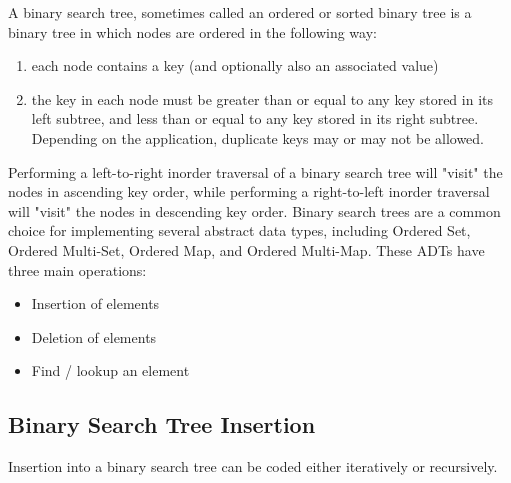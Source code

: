 \documentclass{report}
\begin{document}
    \pagebreak 
    \bigbreak \noindent 
    \begin{concept}
        A binary search tree, sometimes called an ordered or sorted binary tree is a binary tree in which nodes are ordered in the following way:
        \begin{enumerate}
            \item each node contains a key (and optionally also an associated value)
            \item the key in each node must be greater than or equal to any key stored in its left subtree, and less than or equal to any key stored in its right subtree. Depending on the application, duplicate keys may or may not be allowed.
        \end{enumerate}
    \end{concept}
    \bigbreak \noindent 
    Performing a left-to-right inorder traversal of a binary search tree will "visit" the nodes in ascending key order, while performing a right-to-left inorder traversal will "visit" the nodes in descending key order.
    \bigbreak \noindent 
    Binary search trees are a common choice for implementing several abstract data types, including Ordered Set, Ordered Multi-Set, Ordered Map, and Ordered Multi-Map. These ADTs have three main operations:
    \begin{itemize}
        \item Insertion of elements
        \item Deletion of elements
        \item Find / lookup an element
    \end{itemize}
    \bigbreak \noindent 
    \subsection{Binary Search Tree Insertion}
    \bigbreak \noindent 
    Insertion into a binary search tree can be coded either iteratively or recursively. 
    \bigbreak \noindent 
    \bigbreak \noindent 
\end{document}

